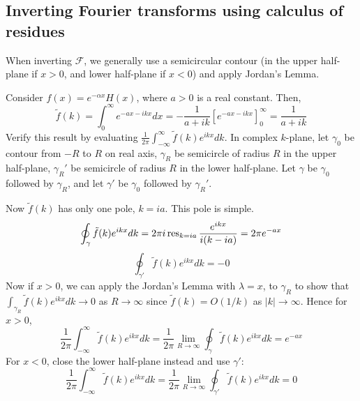 \documentclass[a4paper]{article}
\begin{document}
\subsection{Inverting Fourier transforms using calculus of residues}
When inverting $\mathcal{F}$, we generally use a semicircular contour (in the upper half-plane if $x>0$, and lower half-plane if $x<0$) and apply Jordan's Lemma.
\begin{eg}
Consider $f(x)=e^{-\alpha x}H(x)$, where $a>0$ is a real constant. Then,
$$\tilde{f}(k)=\int_0^\infty e^{-ax-ikx}dx=-\frac{1}{a+ik}[e^{-ax-ikx}]_0^\infty=\frac{1}{a+ik}$$
Verify this result by evaluating $\frac{1}{2\pi}\int_{-\infty}^\infty\tilde{f}(k)e^{ikx}dk$. In complex $k$-plane, let $\gamma_0$ be contour from $-R$ to $R$ on real axis, $\gamma_R$ be semicircle of radius $R$ in the upper half-plane, $\gamma_R'$ be semicircle of radius $R$ in the lower half-plane. Let $\gamma$ be $\gamma_0$ followed by $\gamma_R$, and let $\gamma'$ be $\gamma_0$ followed by $\gamma_R'$.
\begin{center}
  \end{center}
Now $\tilde{f}(k)$ has only one pole, $k=ia$. This pole is simple.
$$\oint_\gamma\tilde{f}(k)e^{ikx}dk=2\pi i\operatorname{res}_{k=ia}\frac{e^{ikx}}{i(k-ia)}=2\pi e^{-ax}$$
$$\oint_{\gamma'}\tilde{f}(k)e^{ikx}dk=-0$$
Now if $x>0$, we can apply the Jordan's Lemma with $\lambda =x$, to $\gamma_R$ to show that $\int_{\gamma_R}\tilde{f}(k)e^{ikx}dk\rightarrow 0$ as $R\rightarrow\infty$ since $\tilde{f}(k)=O(1/k)$ as $|k|\rightarrow\infty$. Hence for $x>0$,
$$\frac{1}{2\pi}\int_{-\infty}^\infty\tilde{f}(k)e^{ikx}dk=\frac{1}{2\pi}\lim_{R\rightarrow\infty}\oint_\gamma\tilde{f}(k)e^{ikx}dk=e^{-ax}$$
For $x<0$, close the lower half-plane instead and use $\gamma'$:
$$\frac{1}{2\pi}\int_{-\infty}^\infty\tilde{f}(k)e^{ikx}dk=\frac{1}{2\pi}\lim_{R\rightarrow\infty}\oint_{\gamma'}\tilde{f}(k)e^{ikx}dk=0$$
\end{eg}
\end{document}
